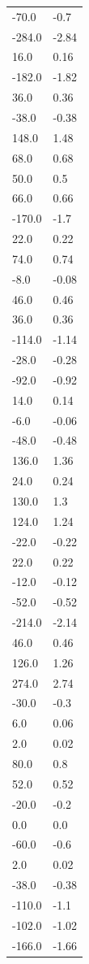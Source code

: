 \begin{longtable}{ll}
-70.0 & -0.7 \\
-284.0 & -2.84 \\
16.0 & 0.16 \\
-182.0 & -1.82 \\
36.0 & 0.36 \\
-38.0 & -0.38 \\
148.0 & 1.48 \\
68.0 & 0.68 \\
50.0 & 0.5 \\
66.0 & 0.66 \\
-170.0 & -1.7 \\
22.0 & 0.22 \\
74.0 & 0.74 \\
-8.0 & -0.08 \\
46.0 & 0.46 \\
36.0 & 0.36 \\
-114.0 & -1.14 \\
-28.0 & -0.28 \\
-92.0 & -0.92 \\
14.0 & 0.14 \\
-6.0 & -0.06 \\
-48.0 & -0.48 \\
136.0 & 1.36 \\
24.0 & 0.24 \\
130.0 & 1.3 \\
124.0 & 1.24 \\
-22.0 & -0.22 \\
22.0 & 0.22 \\
-12.0 & -0.12 \\
-52.0 & -0.52 \\
-214.0 & -2.14 \\
46.0 & 0.46 \\
126.0 & 1.26 \\
274.0 & 2.74 \\
-30.0 & -0.3 \\
6.0 & 0.06 \\
2.0 & 0.02 \\
80.0 & 0.8 \\
52.0 & 0.52 \\
-20.0 & -0.2 \\
0.0 & 0.0 \\
-60.0 & -0.6 \\
2.0 & 0.02 \\
-38.0 & -0.38 \\
-110.0 & -1.1 \\
-102.0 & -1.02 \\
-166.0 & -1.66 \\

\end{longtable}
